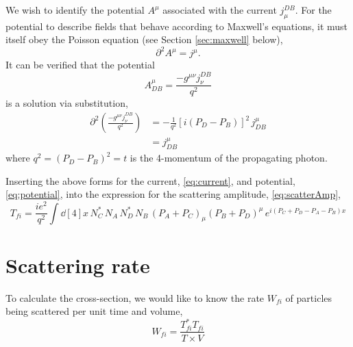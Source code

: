 \documentclass{report}
\begin{document}
We wish to identify the potential $A^\mu$ associated with the current $j_\mu^{DB}$. For the potential to describe fields that behave according to Maxwell's equations, it must itself obey the Poisson equation (see Section \ref{sec:maxwell} below),
\begin{equation}
\partial^2 A^\mu = j^\mu.
\end{equation}
It can be verified that the potential
\begin{equation}
A_{DB}^\mu = \frac{- g^{\mu\nu} j^{DB}_\nu}{q^2} \label{eq:potential}
\end{equation}
is a solution via substitution,
\begin{align}
\partial^2 \left( \frac{-g^{\mu\nu} j^{DB}_\nu}{q^2} \right) &= -\frac{1}{q^2} \left[ i(P_D - P_B) \right]^2 \, j_{DB}^\mu \nonumber \\
&= j_{DB}^\mu
\end{align}
where $q^2 = (P_D - P_B)^2 = t$ is the 4-momentum of the propagating photon.

Inserting the above forms for the current, \eqref{eq:current}, and potential, \eqref{eq:potential}, into the expression for the scattering amplitude, \eqref{eq:scatterAmp},
\begin{equation}
T_{fi} = \frac{ie^2}{q^2} \int \dd[4]{x} \, N_C^* \, N_A \, N_D^* \, N_B \, (P_A + P_C)_\mu (P_B + P_D)^\mu \, e^{i(P_C+P_D-P_A-P_B)x}
\end{equation}

\section{Scattering rate}
To calculate the cross-section, we would like to know the rate $W_{fi}$ of particles being scattered per unit time and volume,
\begin{equation}\boxed{
W_{fi} = \frac{T_{fi}^* T_{fi}}{T \times V}
}\end{equation}
\end{document}
